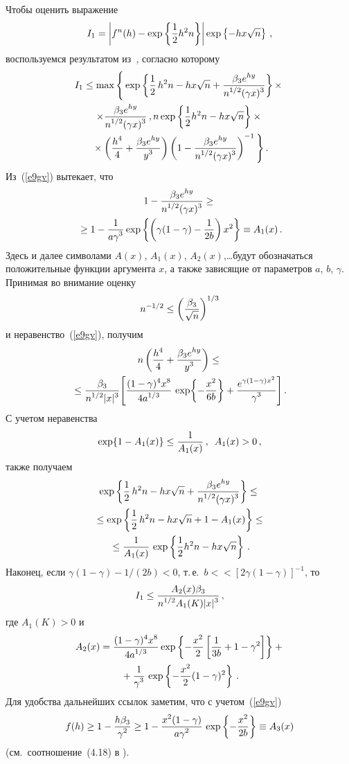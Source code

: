 \begin{multicols}{2}
Чтобы оценить выражение
$$
I_1=\left|f^n(h)-\exp\left\{\fr{1}{2}h^2n\right\}\right|
\exp\left\{-hx\sqrt{n}\right\}\,,
$$
воспользуемся результатом из~\cite{Tysiak}, согласно
которому
\begin{multline*}
I_1\le
\max\left\{
\vphantom{\left(1-\fr{\betr e^{hy}}{n^{\d/2}(\gamma
x)^{\dd}}\right)^{-1}}
\exp\left\{\fr{1}{2}\,h^2n-hx \sqrt{n}+
\fr{\betr e^{hy}}{n^{\d/2}(\gamma x)^{\dd}}\right\}\times\right.{}\\
\times \fr{\betr
e^{hy}}{n^{\d/2}(\gamma x)^{\dd}}\,, n\exp\left\{\fr{1}{2}h^2n-hx\sqrt{n}\right\}\times{}\\
\left.{}\times
\left(\fr{h^4}{4}+\fr{\betr
e^{hy}}{y^{\dd}}\right)\left(1-\fr{\betr e^{hy}}{n^{\d/2}(\gamma
x)^{\dd}}\right)^{-1}
\vphantom{}
\right\}.
\end{multline*}
Из~(\ref{e9gv}) вытекает, что
\begin{multline*}
1-\fr{\betr e^{hy}}{n^{\d/2}(\gamma x)^{\dd}}\ge{}\\
{}\ge 1-\fr{1}{a
\gamma^{\dd}}\exp\left\{\left(\gamma(1-\gamma)-\fr{1}{2b}\right)x^2\right\}\equiv
A_1(x)\,.
\end{multline*}
Здесь и далее символами $A(x)$, $A_1(x)$, $A_2(x)$,\ldots будут
обозначаться положительные функции аргумента $x$, а также
зависящие от параметров $a$, $b$, $\gamma$. Принимая во внимание
оценку
$$
n^{-1/2}\le\left(\Lo\right)^{1/3}
$$
и неравенство~(\ref{e9gv}), получим
\begin{multline*}
n\left(\fr{h^4}{4}+\fr{\betr e^{hy}}{y^{\dd}}\right)\le{}\\
\!{}\le
\fr{\betr}{n^{\d/2}|x|^{\dd}}\!\left[\fr{(1-\gamma)^4x^8}{4a^{1/3}}\,
\exp\!\left\{-\fr{x^2}{6b}\right\}+\fr{e^{\gamma(1-\gamma)x^2}}{\gamma^{\dd}}\right].
\end{multline*}
С учетом неравенства
$$
\exp\{1-A_1(x)\}\le\fr{1}{A_1(x)}\,,\enskip A_1(x)>0\,,
$$
также получаем
\begin{multline*}
\exp\left\{\fr{1}{2}\,h^2n-hx\sqrt{n}+ \fr{\betr
e^{hy}}{n^{1/2}(\gamma x)^{\dd}}\right\}\le{}\\
{}\le
\exp\left\{\fr{1}{2}\,h^2n-hx\sqrt{n}+1-A_1(x)\right\}\le{}\\
{}\le
\fr{1}{A_1(x)}\,\exp\left\{\fr{1}{2}h^2n-hx\sqrt{n}\right\}\,.
\end{multline*}
Наконец, если $\gamma(1-\gamma)-1/(2b)<0$, т.\,е.\
$b<$\linebreak $<[2\gamma(1-\gamma)]^{-1}$, то
\begin{equation}
I_1\le\fr{A_2(x)\betr}{n^{\d/2}A_1(K)|x|^{\dd}}\,,\label{e11gv}
\end{equation}
где $A_1(K)>0$ и
\begin{multline*}
A_2(x)=\fr{(1-\gamma)^4x^8}{4a^{1/3}}
\exp\left\{-\fr{x^2}{2}\left[\fr{1}{3b}+1-\gamma^2\right]\right\}+{}\\
{}+
\fr{1}{\gamma^{\dd}}\,\exp\left\{-\fr{x^2}{2}(1-\gamma)^2\right\}\,.
\end{multline*}
Для удобства дальнейших ссылок заметим, что с учетом~(\ref{e9gv})
$$
f(h)\ge 1-\fr{h\betr}{\gamma^{2}}\ge
1-\fr{x^2(1-\gamma)}{a\gamma^{2}}\,\exp\left\{-\fr{x^2}{2b}\right\}\equiv
A_3(x)
$$
(см.\ соотношение~(4.18) в \cite{Tysiak}).


\end{multicols}
